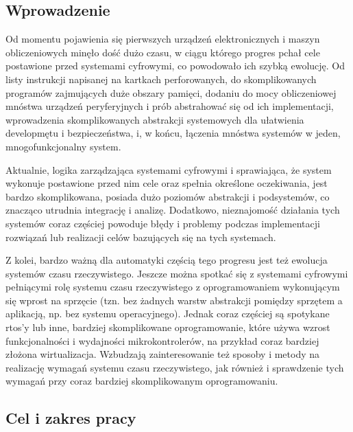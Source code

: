 \documentclass[../../main]{subfiles}
\begin{document}
\subsection{Wprowadzenie}

Od momentu pojawienia się  pierwszych urządzeń elektronicznych i maszyn
obliczeniowych minęło dość dużo czasu, w ciągu którego progres pchał  cele
postawione przed systemami cyfrowymi, co powodowało ich szybką ewolucję. Od listy instrukcji napisanej
na kartkach perforowanych, do skomplikowanych programów zajmujących duże obszary pamięci, dodaniu do
mocy obliczeniowej mnóstwa urządzeń peryferyjnych i prób abstrahować się od ich implementacji,
wprowadzenia skomplikowanych abstrakcji systemowych dla ułatwienia developmętu  i
bezpieczeństwa, i, w końcu, łączenia mnóstwa systemów w jeden, mnogofunkcjonalny system.

Aktualnie, logika zarządzająca systemami cyfrowymi i sprawiająca, że system wykonuje postawione przed
nim cele oraz spełnia określone oczekiwania, jest bardzo skomplikowana, posiada dużo poziomów
abstrakcji i podsystemów, co znacząco utrudnia integrację i analizę. Dodatkowo, nieznajomość działania
 tych systemów coraz częściej powoduje błędy i problemy podczas
implementacji rozwiązań lub realizacji celów bazujących się na tych systemach.

Z kolei, bardzo ważną dla automatyki częścią tego progresu jest też ewolucja systemów czasu
rzeczywistego. Jeszcze można spotkać się z systemami cyfrowymi pełniącymi rolę systemu czasu
rzeczywistego z oprogramowaniem wykonującym się wprost na sprzęcie (tzn. bez żadnych warstw abstrakcji
pomiędzy sprzętem a aplikacją, np. bez systemu operacyjnego). Jednak coraz częściej są spotykane
\acrshort{rtos}'y lub inne, bardziej skomplikowane oprogramowanie, które używa wzrost funkcjonalności i
wydajności  mikrokontrolerów, na przykład coraz bardziej złożona wirtualizacja.
Wzbudzają zainteresowanie też sposoby i metody na realizację wymagań systemu czasu rzeczywistego, jak
również i sprawdzenie tych wymagań przy coraz bardziej skomplikowanym oprogramowaniu.

\subsection{Cel i zakres pracy}
\end{document}
